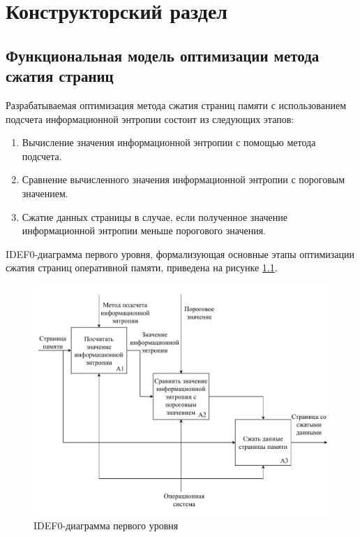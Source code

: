 \chapter{Конструкторский раздел}\label{design}

\section{Функциональная модель оптимизации метода сжатия страниц}

Разрабатываемая оптимизация метода сжатия страниц памяти с использованием подсчета информационной энтропии состоит из следующих этапов:

\begin{enumerate}
	\item Вычисление значения информационной энтропии с помощью метода подсчета.
	\item Сравнение вычисленного значения информационной энтропии с пороговым значением.
	\item Сжатие данных страницы в случае, если полученное значение информационной энтропии меньше порогового значения.
\end{enumerate}

IDEF0-диаграмма первого уровня, формализующая основные этапы оптимизации сжатия страниц оперативной памяти, приведена на рисунке \ref{img:first-level}.

\begin{figure}[H]
	\begin{center}
		\includegraphics[scale=0.6]{inc/img/first-level.pdf}
	\end{center}
	\captionsetup{justification=centering}
	\caption{IDEF0-диаграмма первого уровня}
	\label{img:first-level}
\end{figure}

